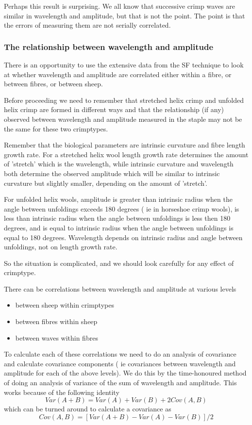\documentclass[titlepage,10pt]{article}  %
\begin{document}
Perhaps this result is surprising. We all know that successive crimp waves are similar in wavelength and amplitude, but that is not the point. The point is that the errors of measuring them are not serially correlated.


\subsubsection{The relationship between wavelength and amplitude}
There is an opportunity to use the extensive data from the SF technique to look at whether wavelength and amplitude are correlated either within a fibre, or between fibres, or between sheep. 

Before proceeding we need to remember that stretched helix crimp and unfolded helix crimp are formed in different ways and that the relationship (if any) observed between wavelength and amplitude measured in the staple may not be the same for these two crimptypes. 

Remember that the biological parameters are intrinsic curvature and fibre length growth rate. For a stretched helix wool length growth rate determines the amount of 'stretch' which is the wavelength, while intrinsic curvature and wavelength both determine the observed amplitude which will be similar to intrinsic curvature but slightly smaller, depending on the amount of 'stretch'.

For unfolded helix wools, amplitude is greater than intrinsic radius when the angle between unfoldings exceeds 180 degrees ( ie in horseshoe crimp wools), is less than intrinsic radius when the angle between unfoldings is less then 180 degrees, and is equal to intrinsic radius when the angle between unfoldings is equal to 180 degrees.  Wavelength depends on intrinsic radius and angle between unfoldings, not on length growth rate.

So the situation is complicated, and we should look carefully for any effect of crimptype.

There can be correlations between wavelength and amplitude at various levels
\begin{itemize}
\item between sheep within crimptypes
\item between fibres within sheep
\item between waves within fibres
\end{itemize}
To calculate each of these correlations we need to do an analysis of covariance and calculate covariance components ( ie covariances between wavelength and amplitude for each of the above levels). We do this by the time-honoured method of doing an analysis of variance of the sum of wavelength and amplitude. This works because of the following identity
\begin{displaymath}
Var(A + B) = Var(A) + Var(B) + 2 Cov(A,B)
\end{displaymath}
which can be turned around to calculate a covariance as
\begin{displaymath}
Cov(A,B) = [Var(A + B) - Var(A) -  Var(B)]/2
\end{displaymath}
\end{document}
